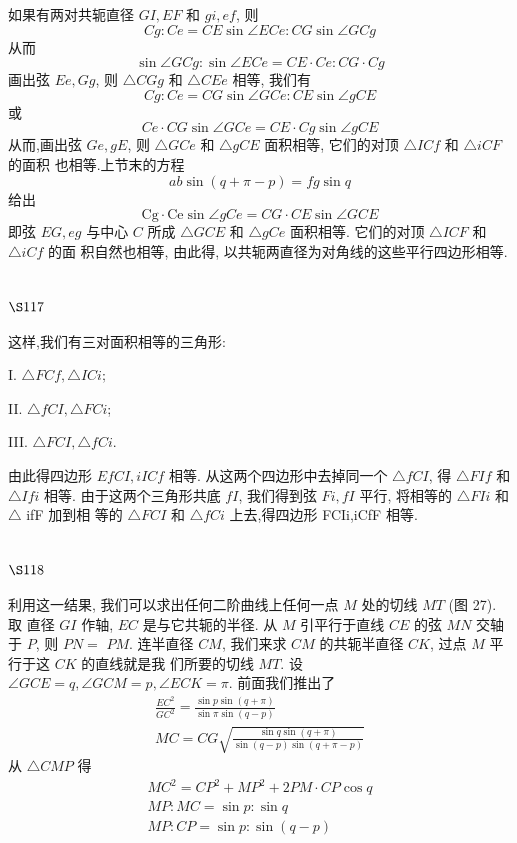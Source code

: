 如果有两对共轭直径 $G I, E F$ 和 $g i, e f$, 则
\[
C g: C e=C E \sin \angle E C e: C G \sin \angle G C g
\]
从而
\[
\sin \angle G C g: \sin \angle E C e=C E \cdot C e: C G \cdot C g
\]
画出弦 $E e, G g$, 则 $\triangle C G g$ 和 $\triangle C E e$ 相等, 我们有
\[
C g: C e=C G \sin \angle G C e: C E \sin \angle g C E
\]
或
\[
C e \cdot C G \sin \angle G C e=C E \cdot C g \sin \angle g C E
\]
从而,画出弦 $G e, g E$, 则 $\triangle G C e$ 和 $\triangle g C E$ 面积相等, 它们的对顶 $\triangle I C f$ 和 $\triangle i C F$ 的面积 也相等.上节末的方程
\[
a b \sin (q+\pi-p)=f g \sin q
\]
给出
\[
\mathrm{Cg} \cdot \mathrm{Ce} \sin \angle g C e=C G \cdot C E \sin \angle G C E
\]
即弦 $E G, e g$ 与中心 $C$ 所成 $\triangle G C E$ 和 $\triangle g C e$ 面积相等. 它们的对顶 $\triangle I C F$ 和 $\triangle i C f$ 的面 积自然也相等, 由此得, 以共轭两直径为对角线的这些平行四边形相等.

\section{$\S 117$}

这样,我们有三对面积相等的三角形:

I. $\triangle F C f, \triangle I C i ;$

II. $\triangle f C I, \triangle F C i$;

III. $\triangle F C I, \triangle f C i$.

由此得四边形 $E f C I, i I C f$ 相等. 从这两个四边形中去掉同一个 $\triangle f C I$, 得 $\triangle F I f$ 和 $\triangle I f i$ 相等. 由于这两个三角形共底 $f I$, 我们得到弦 $F i, f I$ 平行, 将相等的 $\triangle F I i$ 和 $\triangle$ ifF 加到相 等的 $\triangle F C I$ 和 $\triangle f C i$ 上去,得四边形 FCIi,iCfF 相等.

\section{$\S 118$}

利用这一结果, 我们可以求出任何二阶曲线上任何一点 $M$ 处的切线 $M T$ (图 27). 取 直径 $G I$ 作轴, $E C$ 是与它共轭的半径. 从 $M$ 引平行于直线 $C E$ 的弦 $M N$ 交轴于 $P$, 则 $P N=$ $P M$. 连半直径 $C M$, 我们来求 $C M$ 的共轭半直径 $C K$, 过点 $M$ 平行于这 $C K$ 的直线就是我 们所要的切线 $M T$. 设 $\angle G C E=q, \angle G C M=p, \angle E C K=\pi$. 前面我们推出了
\[
\begin{gathered}
\frac{E C^{2}}{G C^{2}}=\frac{\sin p \sin (q+\pi)}{\sin \pi \sin (q-p)} \\
M C=C G \sqrt{\frac{\sin q \sin (q+\pi)}{\sin (q-p) \sin (q+\pi-p)}}
\end{gathered}
\]
从 $\triangle C M P$ 得
\[
\begin{gathered}
M C^{2}=C P^{2}+M P^{2}+2 P M \cdot C P \cos q \\
M P: M C=\sin p: \sin q \\
M P: C P=\sin p: \sin (q-p)
\end{gathered}
\]

